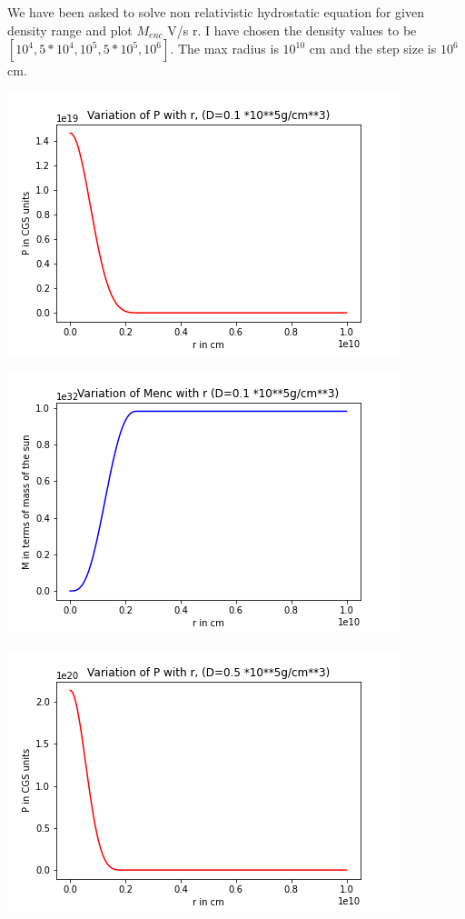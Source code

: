 \documentclass{article}
\begin{document}
  

 
 We have been asked to solve non relativistic hydrostatic equation for given density range and plot $M_{enc}$ V/s r. I have chosen the density values to be $[10^{4}, 5*10^{4}, 10^{5}, 5*10^{5},10^{6}]$. The max radius is $10^{10}$ cm and the step size is $10^{6} $cm. 
 
 \begin{center}
\begin{multicols}{2}
	\begin{center}
        \includegraphics[scale=0.3]{Images/Pr_pb1_0}
        \end{center}
\columnbreak
       \includegraphics[scale=0.3]{Images/Mr_pb1_0}
\end{multicols}
\begin{multicols}{2}
	\begin{center}
        \includegraphics[scale=0.3]{Images/Pr_pb1_1}

\end{center}
\end{multicols}
\end{center}
\end{document}
